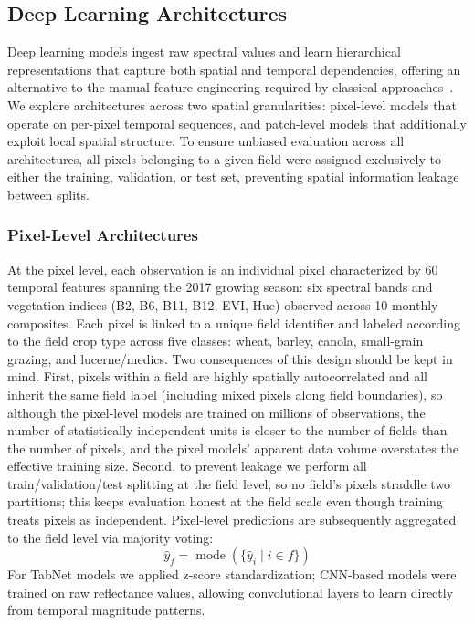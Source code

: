 \documentclass[pdflatex,sn-mathphys]{sn-jnl} %
\begin{document}
\subsection{Deep Learning Architectures}

Deep learning models ingest raw spectral values and learn hierarchical representations
that capture both spatial and temporal dependencies, offering an alternative to the
manual feature engineering required by classical approaches~\cite{zhu2017, tempcnn2019, russwurm2018, cnn_multitemp}.
We explore architectures across two spatial granularities: pixel-level models that
operate on per-pixel temporal sequences, and patch-level models that additionally
exploit local spatial structure. To ensure unbiased evaluation across all architectures,
all pixels belonging to a given field were assigned exclusively to either the training,
validation, or test set, preventing spatial information leakage between splits.

\subsubsection{Pixel-Level Architectures}

At the pixel level, each observation is an individual pixel characterized by 60 temporal
features spanning the 2017 growing season: six spectral bands and vegetation
indices (B2, B6, B11, B12, EVI, Hue) observed across 10 monthly composites.
Each pixel is linked to a unique field identifier and labeled according to the
field crop type across five classes: wheat, barley, canola, small-grain grazing,
and lucerne/medics. Two consequences of this design should be kept in mind. First,
pixels within a field are highly spatially autocorrelated and all inherit the same
field label (including mixed pixels along field boundaries), so although the
pixel-level models are trained on millions of observations, the number of statistically
independent units is closer to the number of fields than the number of pixels, and
the pixel models' apparent data volume overstates the effective training size.
Second, to prevent leakage we perform all train/validation/test splitting at the
field level, so no field's pixels straddle two partitions; this keeps
evaluation honest at the field scale even though training treats pixels as
independent. Pixel-level predictions are subsequently aggregated to the
field level via majority voting:
\[
    \hat{y}_{f} = \operatorname{mode}\!\left(\{\hat{y}_{i} \mid i \in f\}\right)
\]
For TabNet models we applied z-score standardization; CNN-based models were
trained on raw reflectance values, allowing convolutional layers to learn directly
from temporal magnitude patterns.
\end{document}
